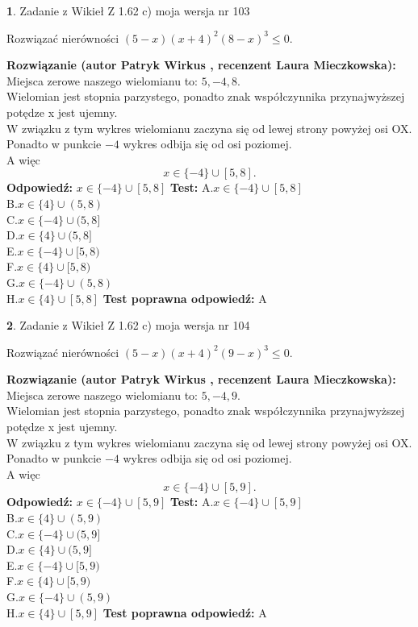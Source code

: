 \documentclass[12pt, a4paper]{article}
\theoremstyle{definition} %
\newtheorem{zad}{}
\newcommand{\zadStart}[1]{\begin{zad}#1\newline}
\newcommand{\zadStop}{\end{zad}}
\newcommand{\rozwStart}[2]{\noindent \textbf{Rozwiązanie (autor #1 , recenzent #2): }\newline}
\newcommand{\rozwStop}{\newline}
\newcommand{\odpStart}{\noindent \textbf{Odpowiedź:}\newline}
\newcommand{\odpStop}{\newline}
\newcommand{\testStart}{\noindent \textbf{Test:}\newline}
\newcommand{\testStop}{\newline}
\newcommand{\kluczStart}{\noindent \textbf{Test poprawna odpowiedź:}\newline}
\newcommand{\kluczStop}{\newline}
\begin{document}
\zadStart{Zadanie z Wikieł Z 1.62 c) moja wersja nr 103}

Rozwiązać nierówności $(5-x)(x+4)^{2}(8-x)^{3}\le0$.
\zadStop
\rozwStart{Patryk Wirkus}{Laura Mieczkowska}
Miejsca zerowe naszego wielomianu to: $5, -4, 8$.\\
Wielomian jest stopnia parzystego, ponadto znak współczynnika przy\linebreak najwyższej potędze x jest ujemny.\\ W związku z tym wykres wielomianu zaczyna się od lewej strony powyżej osi OX.\\
Ponadto w punkcie $-4$ wykres odbija się od osi poziomej.\\
A więc $$x \in \{-4\} \cup [5,8].$$
\rozwStop
\odpStart
$x \in \{-4\} \cup [5,8]$
\odpStop
\testStart
A.$x \in \{-4\} \cup [5,8]$\\
B.$x \in \{4\} \cup (5,8)$\\
C.$x \in \{-4\} \cup (5,8]$\\
D.$x \in \{4\} \cup (5,8]$\\
E.$x \in \{-4\} \cup [5,8)$\\
F.$x \in \{4\} \cup [5,8)$\\
G.$x \in \{-4\} \cup (5,8)$\\
H.$x \in \{4\} \cup [5,8]$
\testStop
\kluczStart
A
\kluczStop



\zadStart{Zadanie z Wikieł Z 1.62 c) moja wersja nr 104}

Rozwiązać nierówności $(5-x)(x+4)^{2}(9-x)^{3}\le0$.
\zadStop
\rozwStart{Patryk Wirkus}{Laura Mieczkowska}
Miejsca zerowe naszego wielomianu to: $5, -4, 9$.\\
Wielomian jest stopnia parzystego, ponadto znak współczynnika przy\linebreak najwyższej potędze x jest ujemny.\\ W związku z tym wykres wielomianu zaczyna się od lewej strony powyżej osi OX.\\
Ponadto w punkcie $-4$ wykres odbija się od osi poziomej.\\
A więc $$x \in \{-4\} \cup [5,9].$$
\rozwStop
\odpStart
$x \in \{-4\} \cup [5,9]$
\odpStop
\testStart
A.$x \in \{-4\} \cup [5,9]$\\
B.$x \in \{4\} \cup (5,9)$\\
C.$x \in \{-4\} \cup (5,9]$\\
D.$x \in \{4\} \cup (5,9]$\\
E.$x \in \{-4\} \cup [5,9)$\\
F.$x \in \{4\} \cup [5,9)$\\
G.$x \in \{-4\} \cup (5,9)$\\
H.$x \in \{4\} \cup [5,9]$
\testStop
\kluczStart
A
\kluczStop
\end{document}
